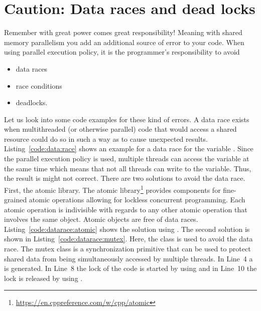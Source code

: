 \documentclass[11pt,fleqn]{book} %
\begin{document}
\section{Caution: Data races and dead locks}
\label{sec:deadlocks}
Remember with great power comes great responsibility! Meaning with shared memory parallelism you add an additional source of error to your code. When using parallel execution policy, it is the programmer's responsibility to avoid
\begin{itemize}
\item data races
\item race conditions
\item deadlocks.
\end{itemize} 
Let us look into some code examples for these kind of errors. A data race exists when multithreaded (or otherwise parallel) code that would access a shared resource could do so in such a way as to cause unexpected results. Listing~\ref{code:data:race} shows an example for a data race for the variable . Since the parallel execution policy is used, multiple threads can access the variable  at the same time which means that not all threads can write to the variable. Thus, the result is might not correct. There are two solutions to avoid the data race. First, the atomic library. The atomic library\footnote{\tiny\url{https://en.cppreference.com/w/cpp/atomic}} provides components for fine-grained atomic operations allowing for lockless concurrent programming. Each atomic operation is indivisible with regards to any other atomic operation that involves the same object. Atomic objects are free of data races. Listing~\ref{code:datarace:atomic} shows the solution using . The second solution is shown in Listing~\ref{code:datarace:mutex}. Here, the  class is used to avoid the data race. The mutex class is a synchronization primitive that can be used to protect shared data from being simultaneously accessed by multiple threads. In Line~4 a  is generated. In Line~8 the lock of the code is started by using  and in Line~10 the lock is released by using .
\end{document}
